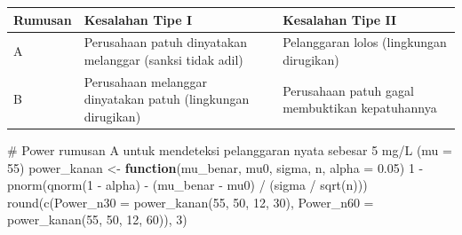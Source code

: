 \documentclass[
  indonesian,
  letterpaper,
]{book}
\newenvironment{Shaded}{\begin{snugshade}}{\end{snugshade}}
\newcommand{\AttributeTok}[1]{\textcolor[rgb]{0.40,0.45,0.13}{#1}}
\newcommand{\CommentTok}[1]{\textcolor[rgb]{0.37,0.37,0.37}{#1}}
\newcommand{\ControlFlowTok}[1]{\textcolor[rgb]{0.00,0.23,0.31}{\textbf{#1}}}
\newcommand{\DecValTok}[1]{\textcolor[rgb]{0.68,0.00,0.00}{#1}}
\newcommand{\FloatTok}[1]{\textcolor[rgb]{0.68,0.00,0.00}{#1}}
\newcommand{\FunctionTok}[1]{\textcolor[rgb]{0.28,0.35,0.67}{#1}}
\newcommand{\NormalTok}[1]{\textcolor[rgb]{0.00,0.23,0.31}{#1}}
\newcommand{\OtherTok}[1]{\textcolor[rgb]{0.00,0.23,0.31}{#1}}
\newcommand{\SpecialCharTok}[1]{\textcolor[rgb]{0.37,0.37,0.37}{#1}}
\newcounter{none} %
\begin{document}
{\def\LTcaptype{none} %
\begin{longtable}[]{@{}
  >{\raggedright\arraybackslash}p{}
  >{\raggedright\arraybackslash}p{}
  >{\raggedright\arraybackslash}p{}@{}}
\toprule\noalign{}
\begin{minipage}[b]{\linewidth}\raggedright
Rumusan
\end{minipage} & \begin{minipage}[b]{\linewidth}\raggedright
Kesalahan Tipe I
\end{minipage} & \begin{minipage}[b]{\linewidth}\raggedright
Kesalahan Tipe II
\end{minipage} \\
\midrule\noalign{}
\endhead
\bottomrule\noalign{}
\endlastfoot
A & Perusahaan patuh dinyatakan melanggar (sanksi tidak adil) &
Pelanggaran lolos (lingkungan dirugikan) \\
B & Perusahaan melanggar dinyatakan patuh (lingkungan dirugikan) &
Perusahaan patuh gagal membuktikan kepatuhannya \\
\end{longtable}
}

\begin{Shaded}
\begin{Highlighting}[]
\CommentTok{\# Power rumusan A untuk mendeteksi pelanggaran nyata sebesar 5 mg/L (mu = 55)}
\NormalTok{power\_kanan }\OtherTok{\textless{}{-}} \ControlFlowTok{function}\NormalTok{(mu\_benar, mu0, sigma, n, }\AttributeTok{alpha =} \FloatTok{0.05}\NormalTok{)}
  \DecValTok{1} \SpecialCharTok{{-}} \FunctionTok{pnorm}\NormalTok{(}\FunctionTok{qnorm}\NormalTok{(}\DecValTok{1} \SpecialCharTok{{-}}\NormalTok{ alpha) }\SpecialCharTok{{-}}\NormalTok{ (mu\_benar }\SpecialCharTok{{-}}\NormalTok{ mu0) }\SpecialCharTok{/}\NormalTok{ (sigma }\SpecialCharTok{/} \FunctionTok{sqrt}\NormalTok{(n)))}
\FunctionTok{round}\NormalTok{(}\FunctionTok{c}\NormalTok{(}\AttributeTok{Power\_n30 =} \FunctionTok{power\_kanan}\NormalTok{(}\DecValTok{55}\NormalTok{, }\DecValTok{50}\NormalTok{, }\DecValTok{12}\NormalTok{, }\DecValTok{30}\NormalTok{), }\AttributeTok{Power\_n60 =} \FunctionTok{power\_kanan}\NormalTok{(}\DecValTok{55}\NormalTok{, }\DecValTok{50}\NormalTok{, }\DecValTok{12}\NormalTok{, }\DecValTok{60}\NormalTok{)), }\DecValTok{3}\NormalTok{)}
\end{Highlighting}
\end{Shaded}
\end{document}
